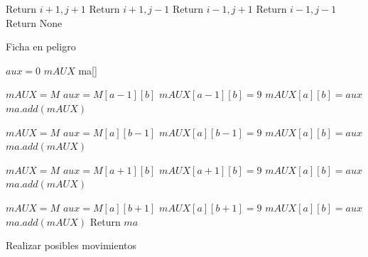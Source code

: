 \documentclass[12pt]{article}
\begin{document}
\begin{algorithm}[H]
  \begin{algorithmic}[1]
    \State Return $i+1,j+1$
    \EndIf
    \State Return $i+1,j-1$
    \EndIf
    \State Return $i-1,j+1$
    \EndIf
    \State Return $i-1,j-1$
    \EndIf
    \EndIf
    \EndFor
    \EndFor
    \State Return None
    
    \EndProcedure         
    \end{algorithmic}
     \caption{Ficha en peligro}
      \end{algorithm}       
    

\begin{algorithm}[H]
  \begin{algorithmic}[1]
        \State $aux = 0$
        \State $mAUX$
        \State ma[]
        
            \State $mAUX = M$
            \State $aux = M[a-1][b]$
            \State $mAUX[a-1][b] = 9$
            \State $mAUX[a][b] = aux$
            \State $ma.add(mAUX)$
            
        \EndIf
        
            \State $mAUX = M$
            \State $aux = M[a][b-1]$
            \State $mAUX[a][b-1] = 9$
            \State $mAUX[a][b] = aux$
            \State $ma.add(mAUX)$
        \EndIf
        
            \State $mAUX = M$
            \State $aux = M[a+1][b]$
            \State $mAUX[a+1][b] = 9$
            \State $mAUX[a][b] = aux$
            \State $ma.add(mAUX)$
        \EndIf
        
            \State $mAUX = M$
            \State $aux = M[a][b+1]$
            \State $mAUX[a][b+1] = 9$
            \State $mAUX[a][b] = aux$
            \State $ma.add(mAUX)$
        \EndIf
    \State Return $ma$
    
    \EndProcedure
    \end{algorithmic}
  \caption{Realizar posibles movimientos}
\end{algorithm}
\end{document}
